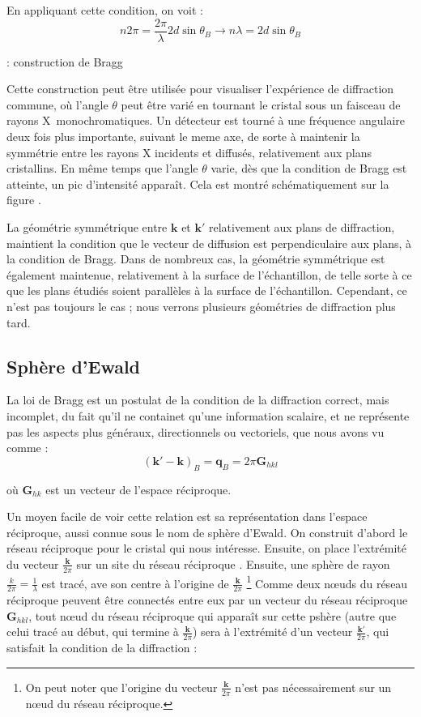 En appliquant cette condition, on voit :
\begin{equation}
    n 2 \pi = \frac{2 \pi}{\lambda} 2d\sin \theta_B \rightarrow
    n\lambda = 2d \sin \theta_B
\end{equation}

\TODO: construction de Bragg

Cette construction peut être utilisée pour visualiser l'expérience de diffraction
commune, où l'angle $\theta$ peut être varié en tournant le cristal sous un
faisceau de rayons X monochromatiques. Un détecteur est tourné à une fréquence
angulaire deux fois plus importante, suivant le meme axe, de sorte à maintenir la
symmétrie entre les rayons X incidents et diffusés, relativement aux plans
cristallins. En même temps que l'angle $\theta$ varie, dès que la condition de
Bragg est atteinte, un pic d'intensité apparaît. Cela est montré schématiquement
sur la figure \TODO.

La géométrie symmétrique entre $\mathbf{k}$ et $\mathbf{k'}$ relativement aux
plans de diffraction, maintient la condition que le vecteur de diffusion est
perpendiculaire aux plans, à la condition de Bragg. Dans de nombreux cas, la
géométrie symmétrique est également maintenue, relativement à la surface de
l'échantillon, de telle sorte à ce que les plans étudiés soient parallèles à la
surface de l'échantillon. Cependant, ce n'est pas toujours le cas ; nous verrons
plusieurs géométries de diffraction plus tard.

\subsection{Sphère d'Ewald}

La loi de Bragg est un postulat de la condition de la diffraction correct, mais
incomplet, du fait qu'il ne containet qu'une information scalaire, et ne
représente pas les aspects plus généraux, directionnels ou vectoriels, que nous
avons vu comme :
\begin{equation}
    (\mathbf{k'-k})_B = \mathbf{q}_B = 2\pi \mathbf{G}_{hkl}
\end{equation}

où $\mathbf{G}_{hk}$ est un vecteur de l'espace réciproque.

Un moyen facile de voir cette relation est sa représentation dans l'espace
réciproque, aussi connue sous le nom de sphère d'Ewald. On construit d'abord le
réseau réciproque pour le cristal qui nous intéresse. Ensuite, on place
l'extrémité du vecteur $\frac{\mathbf{k}}{2\pi}$ sur un site du réseau réciproque
. Ensuite, une sphère de rayon $\frac{k}{2\pi} = \frac{1}{\lambda}$ est tracé,
ave son centre à l'origine de $\frac{\mathbf{k}}{2\pi}$
\footnote{On peut noter que l'origine du vecteur $\frac{\mathbf{k}}{2\pi}$ n'est
pas nécessairement sur un nœud du réseau réciproque.}
Comme deux nœuds du réseau réciproque peuvent être connectés entre eux par un
vecteur du réseau réciproque $\mathbf{G}_{hkl}$, tout nœud du réseau réciproque
qui apparaît sur cette pshère (autre que celui tracé au début, qui termine à
$\frac{\mathbf{k}}{2\pi}$) sera à l'extrémité d'un vecteur
$\frac{\mathbf{k'}}{2\pi}$, qui satisfait la condition de la diffraction :

